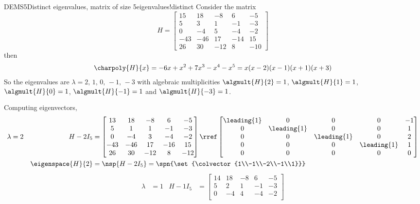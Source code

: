 \begin{example}{DEMS5}{Distinct eigenvalues, matrix of size 5}{eigenvalues!distinct}
Consider the matrix
%
\begin{equation*}
H=
\begin{bmatrix}
15 & 18 & -8 & 6 & -5\\ 
5 & 3 & 1 & -1 & -3\\ 
0 & -4 & 5 & -4 & -2\\ 
-43 & -46 & 17 & -14 & 15\\ 
26 & 30 & -12 & 8 & -10
\end{bmatrix}
\end{equation*}
%
then
%
\begin{equation*}
\charpoly{H}{x}=-6x+x^2+7x^3-x^4-x^5=x(x-2)(x-1)(x+1)(x+3)
\end{equation*}
%
So the eigenvalues are $\lambda=2,\,1,\,0,\,-1,\,-3$ with algebraic multiplicities $\algmult{H}{2}=1$,  $\algmult{H}{1}=1$,  $\algmult{H}{0}=1$,  $\algmult{H}{-1}=1$ and $\algmult{H}{-3}=1$.\par
%
Computing eigenvectors,
%
\begin{align*}
\lambda&=2&H-2I_5&=
\begin{bmatrix}
13 & 18 & -8 & 6 & -5\\ 
5 & 1 & 1 & -1 & -3\\ 
0 & -4 & 3 & -4 & -2\\ 
-43 & -46 & 17 & -16 & 15\\ 
26 & 30 & -12 & 8 & -12
\end{bmatrix}
\rref
\begin{bmatrix}
\leading{1} & 0 & 0 & 0 & -1\\ 
0 & \leading{1} & 0 & 0 & 1\\ 
0 & 0 & \leading{1} & 0 & 2\\ 
0 & 0 & 0 & \leading{1} & 1\\ 
0 & 0 & 0 & 0 & 0
\end{bmatrix}\\
&&\eigenspace{H}{2}&=\nsp{H-2I_5}
=\spn{\set{\colvector{1\\-1\\-2\\-1\\1}}}
\end{align*}
%
\begin{align*}
\lambda&=1&H-1I_5&=
\begin{bmatrix}
14 & 18 & -8 & 6 & -5\\ 
5 & 2 & 1 & -1 & -3\\ 
0 & -4 & 4 & -4 & -2\\ 

\end{bmatrix}
\end{align*}
\end{example}
